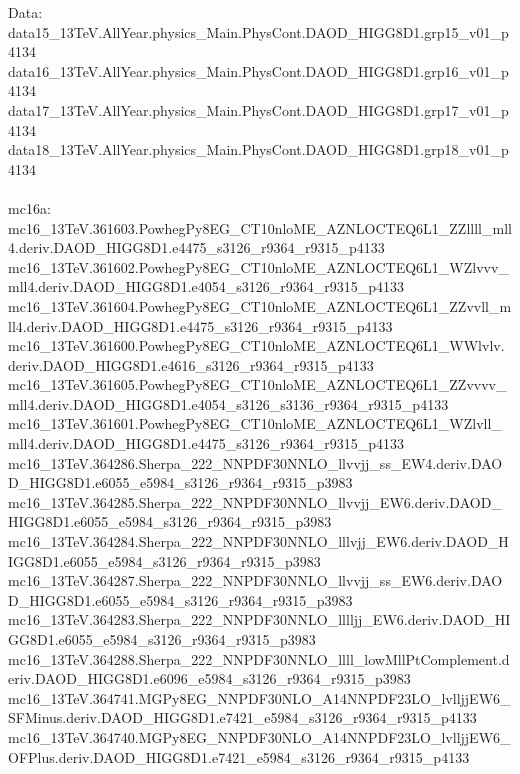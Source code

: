 \begin{scriptsize}
Data: \\
data15\_13TeV.AllYear.physics\_Main.PhysCont.DAOD\_HIGG8D1.grp15\_v01\_p4134 \\
data16\_13TeV.AllYear.physics\_Main.PhysCont.DAOD\_HIGG8D1.grp16\_v01\_p4134 \\
data17\_13TeV.AllYear.physics\_Main.PhysCont.DAOD\_HIGG8D1.grp17\_v01\_p4134 \\
data18\_13TeV.AllYear.physics\_Main.PhysCont.DAOD\_HIGG8D1.grp18\_v01\_p4134 \\
 \\
mc16a: \\
mc16\_13TeV.361603.PowhegPy8EG\_CT10nloME\_AZNLOCTEQ6L1\_ZZllll\_mll4.deriv.DAOD\_HIGG8D1.e4475\_s3126\_r9364\_r9315\_p4133 \\
mc16\_13TeV.361602.PowhegPy8EG\_CT10nloME\_AZNLOCTEQ6L1\_WZlvvv\_mll4.deriv.DAOD\_HIGG8D1.e4054\_s3126\_r9364\_r9315\_p4133 \\
mc16\_13TeV.361604.PowhegPy8EG\_CT10nloME\_AZNLOCTEQ6L1\_ZZvvll\_mll4.deriv.DAOD\_HIGG8D1.e4475\_s3126\_r9364\_r9315\_p4133 \\
mc16\_13TeV.361600.PowhegPy8EG\_CT10nloME\_AZNLOCTEQ6L1\_WWlvlv.deriv.DAOD\_HIGG8D1.e4616\_s3126\_r9364\_r9315\_p4133 \\
mc16\_13TeV.361605.PowhegPy8EG\_CT10nloME\_AZNLOCTEQ6L1\_ZZvvvv\_mll4.deriv.DAOD\_HIGG8D1.e4054\_s3126\_s3136\_r9364\_r9315\_p4133 \\
mc16\_13TeV.361601.PowhegPy8EG\_CT10nloME\_AZNLOCTEQ6L1\_WZlvll\_mll4.deriv.DAOD\_HIGG8D1.e4475\_s3126\_r9364\_r9315\_p4133 \\
mc16\_13TeV.364286.Sherpa\_222\_NNPDF30NNLO\_llvvjj\_ss\_EW4.deriv.DAOD\_HIGG8D1.e6055\_e5984\_s3126\_r9364\_r9315\_p3983
mc16\_13TeV.364285.Sherpa\_222\_NNPDF30NNLO\_llvvjj\_EW6.deriv.DAOD\_HIGG8D1.e6055\_e5984\_s3126\_r9364\_r9315\_p3983
mc16\_13TeV.364284.Sherpa\_222\_NNPDF30NNLO\_lllvjj\_EW6.deriv.DAOD\_HIGG8D1.e6055\_e5984\_s3126\_r9364\_r9315\_p3983
mc16\_13TeV.364287.Sherpa\_222\_NNPDF30NNLO\_llvvjj\_ss\_EW6.deriv.DAOD\_HIGG8D1.e6055\_e5984\_s3126\_r9364\_r9315\_p3983
mc16\_13TeV.364283.Sherpa\_222\_NNPDF30NNLO\_lllljj\_EW6.deriv.DAOD\_HIGG8D1.e6055\_e5984\_s3126\_r9364\_r9315\_p3983
mc16\_13TeV.364288.Sherpa\_222\_NNPDF30NNLO\_llll\_lowMllPtComplement.deriv.DAOD\_HIGG8D1.e6096\_e5984\_s3126\_r9364\_r9315\_p3983
mc16\_13TeV.364741.MGPy8EG\_NNPDF30NLO\_A14NNPDF23LO\_lvlljjEW6\_SFMinus.deriv.DAOD\_HIGG8D1.e7421\_e5984\_s3126\_r9364\_r9315\_p4133 \\
mc16\_13TeV.364740.MGPy8EG\_NNPDF30NLO\_A14NNPDF23LO\_lvlljjEW6\_OFPlus.deriv.DAOD\_HIGG8D1.e7421\_e5984\_s3126\_r9364\_r9315\_p4133 \\

\end{scriptsize}

